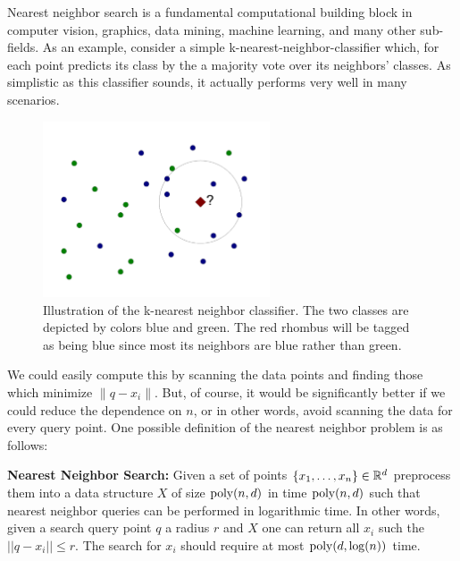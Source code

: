 \documentclass{article}
\begin{document}



Nearest neighbor search is a fundamental computational building block in computer vision, graphics, data mining, machine learning, and many other sub-fields.
As an example, consider a simple k-nearest-neighbor-classifier which, for each point predicts its class
by the a majority vote over its neighbors' classes. As simplistic as this classifier sounds, it actually performs 
very well in many scenarios. 

\begin{figure}[h!]
  \centering
  \includegraphics[width=0.6\textwidth]{11_images/knns_classifier.pdf}
  \caption{Illustration of the k-nearest neighbor classifier. The two classes are depicted by colors blue and green.
  The red rhombus will be tagged as being blue since most its neighbors are blue rather than green.}
\end{figure}

We could easily compute this by scanning the data points and finding those which minimize $\|q - x_i\|$.
But, of course, it would be significantly better if we could reduce the dependence on $n$, or in other words, avoid scanning the data for every query point.
One possible definition of the nearest neighbor problem is as follows:
\begin{definition}{\bf Nearest Neighbor Search:} Given a set of points $\{x_1,\ldots,x_n\} \in {\mathbb{R}}^{d}$ 
preprocess them into a data structure
$X$ of size ${\operatorname{poly}}(n,d)$ in time ${\operatorname{poly}}(n,d)$ such that nearest neighbor queries can
be performed in logarithmic time. In other words, given a search query point $q$ a radius $r$ and $X$ one can 
return all $x_i$ such the $||q - x_i || \le r$. The search for $x_i$ should require at most ${\operatorname{poly}}(d,\log(n))$ time.
\end{definition}
\end{document}
